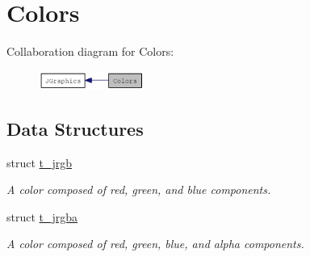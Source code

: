 \hypertarget{group__color}{
\section{Colors}
\label{group__color}
}


Collaboration diagram for Colors:\nopagebreak
\begin{figure}[H]
\begin{center}
\leavevmode
\includegraphics[width=98pt]{group__color}
\end{center}
\end{figure}
\subsection*{Data Structures}
\begin{DoxyCompactItemize}
\item 
struct \hyperlink{structt__jrgb}{t\_\-jrgb}
\begin{DoxyCompactList}\small\item\em A color composed of red, green, and blue components. \item\end{DoxyCompactList}\item 
struct \hyperlink{structt__jrgba}{t\_\-jrgba}
\begin{DoxyCompactList}\small\item\em A color composed of red, green, blue, and alpha components. \item\end{DoxyCompactList}\end{DoxyCompactItemize}
